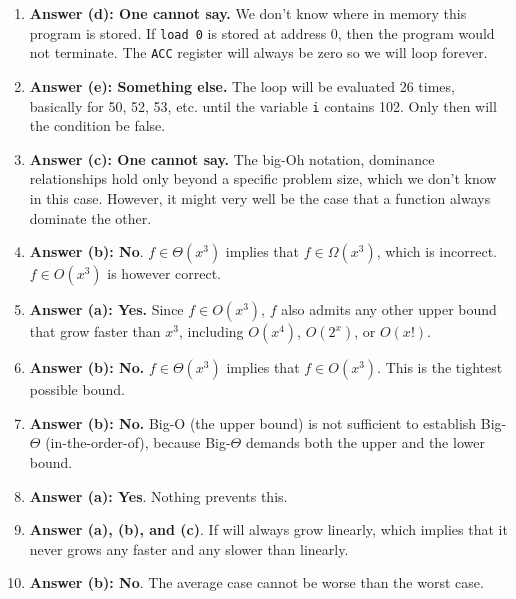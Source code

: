 \documentclass[11pt]{article}
\begin{document}
\begin{enumerate}
\item \textbf{Answer (d): One cannot say.} We don't know where in memory this
program is stored. If \texttt{load 0} is stored at address 0, then the
program would not terminate. The \texttt{ACC} register will always be
zero so we will loop forever.

\item \textbf{Answer (e): Something else.} The loop will be evaluated 26 times,
basically for 50, 52, 53, etc. until the variable \texttt{i}
contains 102. Only then will the condition be false.

\item \textbf{Answer (c): One cannot say.} The big-Oh notation, dominance
relationships hold only beyond a specific problem size, which we
don't know in this case. However, it might very well be the case
that a function always dominate the other.

\item \textbf{Answer (b): No}. \(f \in \Theta(x^3)\) implies that \(f \in
     \Omega(x^3)\), which is incorrect. \(f \in O(x^3)\) is however
correct.

\item \textbf{Answer (a): Yes.} Since \(f \in O(x^3)\), \(f\) also admits any
other upper bound that grow faster than \(x^3\), including
\(O(x^4)\), \(O(2^x)\), or \(O(x!)\).

\item \textbf{Answer (b): No.} \(f \in \Theta(x^3)\) implies that \(f \in
     O(x^3)\). This is the tightest possible bound.

\item \textbf{Answer (b): No.} Big-O (the upper bound) is not sufficient to
establish Big-\(\Theta\) (in-the-order-of), because Big-\(\Theta\)
demands both the upper and the lower bound.

\item \textbf{Answer (a): Yes}. Nothing prevents this.

\item \textbf{Answer (a), (b), and (c)}. If will always grow linearly, which
implies that it never grows any faster and any slower than
linearly.

\item \textbf{Answer (b): No}. The average case cannot be worse than the
worst case.
\end{enumerate}
\end{document}

